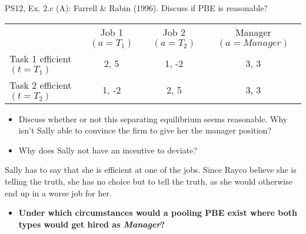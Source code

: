 \begin{frame}{PS12, Ex. 2.c (A): Farrell \& Rabin (1996). Discuss if PBE is reasonable?}
    \begin{table}
      \begin{tabular}{l|c|c|c|}
          \multicolumn{1}{c}{} & \multicolumn{1}{c}{Job 1 $(a=T_1)$} & \multicolumn{1}{c}{Job 2 $(a=T_2)$} & \multicolumn{1}{c}{Manager $(a=Manager)$} \\\cline{2-4}
           Task 1 efficient $(t=T_1)$ & 2, 5 & 1, -2 & 3, 3 \\\cline{2-4}
           Task 2 efficient $(t=T_2)$ & 1, -2 & 2, 5 & 3, 3 \\\cline{2-4}
      \end{tabular}
    \end{table}\vspace{-12pt}
    \begin{itemize}
      \item[(c)] Discuss whether or not this separating equilibrium seems reasonable. Why isn’t Sally able to convince the firm to give her the manager position?
      \item[Step 1:] Why does Sally not have an incentive to deviate?
    \end{itemize}\vspace{-6pt}
    Sally has to say that she is efficient at one of the jobs. Since Rayco believe she is telling the truth, she has no choice but to tell the truth, as she would otherwise end up in a worse job for her.\vspace{-6pt}
    \begin{itemize}
      \item[Step 2:] \textbf{Under which circumstances would a pooling PBE exist where both types would get hired as \textit{Manager}?}
    \end{itemize}
    \vfill\null
\end{frame}
